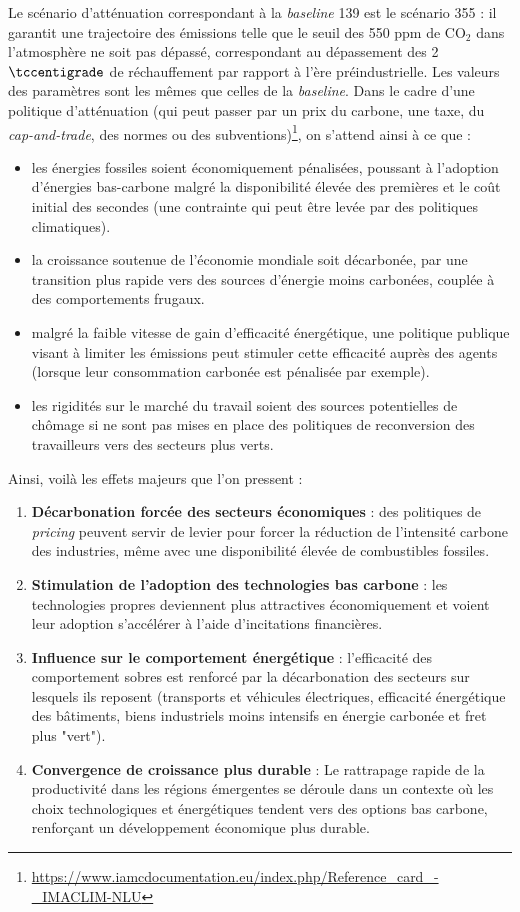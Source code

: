 \documentclass[a4,11pt]{aleph-notas}
\begin{document}
Le scénario d'atténuation correspondant à la \textit{baseline} 139 est le scénario 355 : il garantit une trajectoire des émissions telle que le seuil des 550 ppm de CO$_2$ dans l'atmosphère ne soit pas dépassé, correspondant au dépassement des 2 $\tccentigrade$ de réchauffement par rapport à l'ère préindustrielle. Les valeurs des paramètres sont les mêmes que celles de la \textit{baseline}. Dans le cadre d'une politique d'atténuation (qui peut passer par un prix du carbone, une taxe, du \textit{cap-and-trade}, des normes ou des subventions)\footnote{\url{https://www.iamcdocumentation.eu/index.php/Reference_card_-_IMACLIM-NLU}}, on s'attend ainsi à ce que :
\begin{itemize}
    \item les énergies fossiles soient économiquement pénalisées, poussant à l'adoption d'énergies bas-carbone malgré la disponibilité élevée des premières et le coût initial des secondes (une contrainte qui peut être levée par des politiques climatiques).
    \item la croissance soutenue de l'économie mondiale soit décarbonée, par une transition plus rapide vers des sources d'énergie moins carbonées, couplée à des comportements frugaux.
    \item malgré la faible vitesse de gain d'efficacité énergétique, une politique publique visant à limiter les émissions peut stimuler cette efficacité auprès des agents (lorsque leur consommation carbonée est pénalisée par exemple).
    \item les rigidités sur le marché du travail soient des sources potentielles de chômage si ne sont pas mises en place des politiques de reconversion des travailleurs vers des secteurs plus verts.
\end{itemize} 

Ainsi, voilà les effets majeurs que l'on pressent : 

\begin{enumerate}
    \item \textbf{Décarbonation forcée des secteurs économiques} : des politiques de \textit{pricing} peuvent servir de levier pour forcer la réduction de l’intensité carbone des industries, même avec une disponibilité élevée de combustibles fossiles.
    \item \textbf{Stimulation de l’adoption des technologies bas carbone} : les technologies propres deviennent plus attractives économiquement et voient leur adoption s’accélérer à l'aide d’incitations financières.
    \item \textbf{Influence sur le comportement énergétique} : l'efficacité des comportement sobres est renforcé par la décarbonation des secteurs sur lesquels ils reposent (transports et véhicules électriques, efficacité énergétique des bâtiments, biens industriels moins intensifs en énergie carbonée et fret plus "vert").
    \item \textbf{Convergence de croissance plus durable} : Le rattrapage rapide de la productivité dans les régions émergentes se déroule dans un contexte où les choix technologiques et énergétiques tendent vers des options bas carbone, renforçant un développement économique plus durable.
\end{enumerate}
\end{document}

